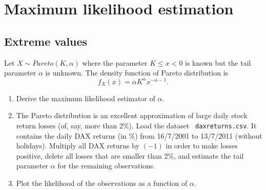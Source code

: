 \documentclass{article}
\begin{document}
\newpage
\section{Maximum likelihood estimation\label{maximumlikelihood}}

\subsection{Extreme values\label{extremes}}

Let $X\sim Pareto(K,\alpha )$ where the parameter $K\leq x <0$ is known but
the tail parameter $\alpha $ is unknown. The density function of Pareto
distribution is%
\begin{equation*}
f_{X}(x)=\alpha K^{\alpha }x^{-\alpha -1}.
\end{equation*}

\begin{enumerate}
\item Derive the maximum likelihood estimator of $\alpha $.

\item The Pareto distribution is an excellent approximation of large daily
stock return losses (of, say, more than 2\%). Load the dataset \texttt{%
daxreturns.csv}. It contains the daily DAX returns (in \%) from 16/7/2001 to
13/7/2011 (without holidays). Multiply all DAX returns by $(-1)$ in order to
make losses positive, delete all losses that are smaller than 2\%, and
estimate the tail parameter $\alpha $ for the remaining observations.

\item Plot the likelihood of the observations as a function of $\alpha $.
\end{enumerate}
\end{document}
